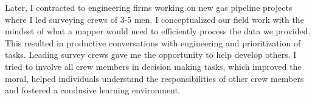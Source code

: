 \documentclass[12pt, letterpaper]{awesome-cv} %
\begin{document}
\begin{cvletter}
Later, I contracted to engineering firms working on new gas pipeline projects where I led surveying crews of 3-5 men. %
I conceptualized our field work with the mindset of what a mapper would need to efficiently process the data we provided. %
This resulted %
in productive conversations with %
engineering %
and prioritization of tasks. %
Leading survey crews gave me the opportunity to help develop others. %
I tried to involve all crew members in decision making tasks, which %
improved the moral, helped individuals understand the responsibilities of other crew members and fostered a condusive learning environment. %


\end{cvletter}
\end{document}
